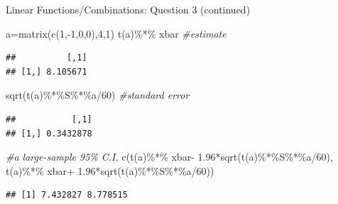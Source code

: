 \documentclass[
  ignorenonframetext,
]{beamer}
\newenvironment{Shaded}{\begin{snugshade}}{\end{snugshade}}
\newcommand{\CommentTok}[1]{\textcolor[rgb]{0.56,0.35,0.01}{\textit{#1}}}
\newcommand{\DecValTok}[1]{\textcolor[rgb]{0.00,0.00,0.81}{#1}}
\newcommand{\FloatTok}[1]{\textcolor[rgb]{0.00,0.00,0.81}{#1}}
\newcommand{\FunctionTok}[1]{\textcolor[rgb]{0.00,0.00,0.00}{#1}}
\newcommand{\NormalTok}[1]{#1}
\newcommand{\OtherTok}[1]{\textcolor[rgb]{0.56,0.35,0.01}{#1}}
\newcommand{\SpecialCharTok}[1]{\textcolor[rgb]{0.00,0.00,0.00}{#1}}
\begin{document}
\begin{frame}[fragile]{Linear Functions/Combinations: Question 3
(continued)}
\protect\hypertarget{linear-functionscombinations-question-3-continued}{}
\begin{Shaded}
\begin{Highlighting}[]
\NormalTok{a}\OtherTok{=}\FunctionTok{matrix}\NormalTok{(}\FunctionTok{c}\NormalTok{(}\DecValTok{1}\NormalTok{,}\SpecialCharTok{{-}}\DecValTok{1}\NormalTok{,}\DecValTok{0}\NormalTok{,}\DecValTok{0}\NormalTok{),}\DecValTok{4}\NormalTok{,}\DecValTok{1}\NormalTok{)}
\FunctionTok{t}\NormalTok{(a)}\SpecialCharTok{\%*\%}\NormalTok{ xbar }\CommentTok{\#estimate }
\end{Highlighting}
\end{Shaded}

\begin{verbatim}
##          [,1]
## [1,] 8.105671
\end{verbatim}

\begin{Shaded}
\begin{Highlighting}[]
\FunctionTok{sqrt}\NormalTok{(}\FunctionTok{t}\NormalTok{(a)}\SpecialCharTok{\%*\%}\NormalTok{S}\SpecialCharTok{\%*\%}\NormalTok{a}\SpecialCharTok{/}\DecValTok{60}\NormalTok{) }\CommentTok{\#standard error}
\end{Highlighting}
\end{Shaded}

\begin{verbatim}
##           [,1]
## [1,] 0.3432878
\end{verbatim}

\begin{Shaded}
\begin{Highlighting}[]
\CommentTok{\#a large{-}sample 95\% C.I. }
\FunctionTok{c}\NormalTok{(}\FunctionTok{t}\NormalTok{(a)}\SpecialCharTok{\%*\%}\NormalTok{ xbar}\SpecialCharTok{{-}} \FloatTok{1.96}\SpecialCharTok{*}\FunctionTok{sqrt}\NormalTok{(}\FunctionTok{t}\NormalTok{(a)}\SpecialCharTok{\%*\%}\NormalTok{S}\SpecialCharTok{\%*\%}\NormalTok{a}\SpecialCharTok{/}\DecValTok{60}\NormalTok{), }
  \FunctionTok{t}\NormalTok{(a)}\SpecialCharTok{\%*\%}\NormalTok{ xbar}\SpecialCharTok{+} \FloatTok{1.96}\SpecialCharTok{*}\FunctionTok{sqrt}\NormalTok{(}\FunctionTok{t}\NormalTok{(a)}\SpecialCharTok{\%*\%}\NormalTok{S}\SpecialCharTok{\%*\%}\NormalTok{a}\SpecialCharTok{/}\DecValTok{60}\NormalTok{))}
\end{Highlighting}
\end{Shaded}

\begin{verbatim}
## [1] 7.432827 8.778515
\end{verbatim}
\end{frame}
\end{document}
